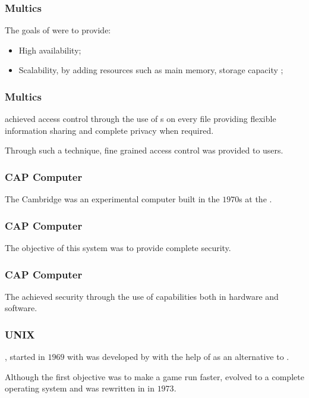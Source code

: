 
\begin{frame}
  \frametitle{Multics}

  The goals of  were to provide:

  \begin{itemize}
    \item
      High availability;
    \item
      Scalability, by adding resources such as main memory, storage capacity
      \etc{};
  \end{itemize}
\end{frame}


\begin{frame}
  \frametitle{Multics}

   achieved access control through the use of s on every file providing flexible information sharing and
  complete privacy when required.

  \-

  Through such a technique, fine grained access control was provided to users.
\end{frame}


\begin{frame}
  \frametitle{CAP Computer}

  The Cambridge  was an experimental computer built
  in the $1970$s at the .
\end{frame}


\begin{frame}
  \frametitle{CAP Computer}

  The objective of this system was to provide complete security.
\end{frame}


\begin{frame}
  \frametitle{CAP Computer}

  The  achieved security through the use of capabilities
  both in hardware and software.
\end{frame}


\begin{frame}
  \frametitle{UNIX}

  , started in $1969$ with  was developed by
   with the help of  as an alternative
  to .

  \-

  Although the first objective was to make a game run faster, 
  evolved to a complete operating system and was rewritten in 
  in $1973$.
\end{frame}

